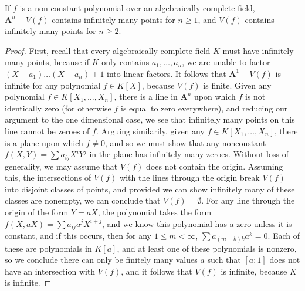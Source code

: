 \begin{prop}
    If $f$ is a non constant polynomial over an algebraically complete field, $\mathbf{A}^n - V(f)$ contains infinitely many points for $n \geq 1$, and $V(f)$ contains infinitely many points for $n \geq 2$.
\end{prop}
\begin{proof}
    First, recall that every algebraically complete field $K$ must have infinitely many points, because if $K$ only contains $a_1, \dots, a_n$, we are unable to factor $(X - a_1) \dots (X - a_n) + 1$ into linear factors. It follows that $\mathbf{A}^1 - V(f)$ is infinite for any polynomial $f \in K[X]$, because $V(f)$ is finite. Given any polynomial $f \in K[X_1, \dots, X_n]$, there is a line in $\mathbf{A}^n$ upon which $f$ is not identically zero (for otherwise $f$ is equal to zero everywhere), and reducing our argument to the one dimensional case, we see that infinitely many points on this line cannot be zeroes of $f$. Arguing similarily, given any $f \in K[X_1, \dots, X_n]$, there is a plane upon which $f \neq 0$, and so we must show that any nonconstant $f(X,Y) = \sum a_{ij} X^i Y^j$ in the plane has infinitely many zeroes. Without loss of generality, we may assume that $V(f)$ does not contain the origin. Assuming this, the intersections of $V(f)$ with the lines through the origin break $V(f)$ into disjoint classes of points, and provided we can show infinitely many of these classes are nonempty, we can conclude that $V(f) = \emptyset$. For any line through the origin of the form $Y = aX$, the polynomial takes the form $f(X,aX) = \sum a_{ij} a^j X^{i+j}$, and we know this polynomial has a zero unless it is constant, and if this occurs, then for any $1 \leq m < \infty$, $\sum a_{(m-k)k} a^k = 0$. Each of these are polynomials in $K[a]$, and at least one of these polynomials is nonzero, so we conclude there can only be finitely many values $a$ such that $[a:1]$ does not have an intersection with $V(f)$, and it follows that $V(f)$ is infinite, because $K$ is infinite.
\end{proof}

